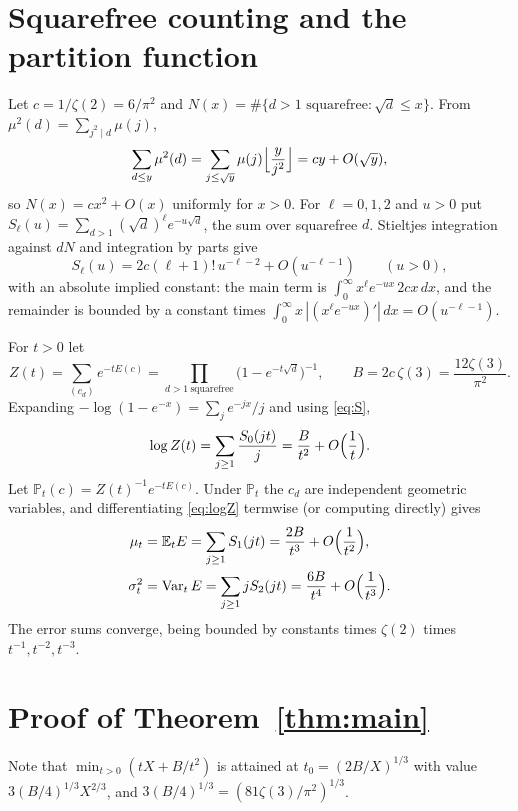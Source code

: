 \documentclass[11pt,a4paper]{article}
\theoremstyle{remark}
\begin{document}
\section{Squarefree counting and the partition function}

Let $c=1/\zeta(2)=6/\pi^2$ and $N(x)=\#\{d>1\text{ squarefree}:\sqrt d\le x\}$. From $\mu^2(d)=\sum_{j^2\mid d}\mu(j)$,
\[
 \sum_{d\le y}\mu^2(d)=\sum_{j\le\sqrt y}\mu(j)\Bigl\lfloor\frac y{j^2}\Bigr\rfloor=cy+O(\sqrt y),
\]
so $N(x)=cx^2+O(x)$ uniformly for $x>0$. For $\ell=0,1,2$ and $u>0$ put $S_\ell(u)=\sum_{d>1}(\sqrt d)^\ell e^{-u\sqrt d}$, the sum over squarefree $d$. Stieltjes integration against $dN$ and integration by parts give
\begin{equation}\label{eq:S}
 S_\ell(u)=2c(\ell+1)!\,u^{-\ell-2}+O(u^{-\ell-1})\qquad(u>0),
\end{equation}
with an absolute implied constant: the main term is $\int_0^\infty x^\ell e^{-ux}\,2cx\,dx$, and the remainder is bounded by a constant times $\int_0^\infty x\,|(x^\ell e^{-ux})'|\,dx=O(u^{-\ell-1})$.

For $t>0$ let
\[
 Z(t)=\sum_{(c_d)}e^{-tE(c)}=\prod_{d>1\ \mathrm{squarefree}}\bigl(1-e^{-t\sqrt d}\bigr)^{-1},\qquad B=2c\,\zeta(3)=\frac{12\zeta(3)}{\pi^2}.
\]
Expanding $-\log(1-e^{-x})=\sum_j e^{-jx}/j$ and using \eqref{eq:S},
\begin{equation}\label{eq:logZ}
 \log Z(t)=\sum_{j\ge1}\frac{S_0(jt)}j=\frac B{t^2}+O\Bigl(\frac1t\Bigr).
\end{equation}
Let $\mathbb P_t(c)=Z(t)^{-1}e^{-tE(c)}$. Under $\mathbb P_t$ the $c_d$ are independent geometric variables, and differentiating \eqref{eq:logZ} termwise (or computing directly) gives
\begin{align}
 \mu_t&=\mathbb E_tE=\sum_{j\ge1}S_1(jt)=\frac{2B}{t^3}+O\Bigl(\frac1{t^2}\Bigr),\label{eq:mean}\\
 \sigma_t^2&=\operatorname{Var}_tE=\sum_{j\ge1}jS_2(jt)=\frac{6B}{t^4}+O\Bigl(\frac1{t^3}\Bigr).\label{eq:var}
\end{align}
The error sums converge, being bounded by constants times $\zeta(2)$ times $t^{-1},t^{-2},t^{-3}$.

\section{Proof of Theorem~\ref{thm:main}}

Note that $\min_{t>0}(tX+B/t^2)$ is attained at $t_0=(2B/X)^{1/3}$ with value $3(B/4)^{1/3}X^{2/3}$, and $3(B/4)^{1/3}=(81\zeta(3)/\pi^2)^{1/3}$.
\end{document}
